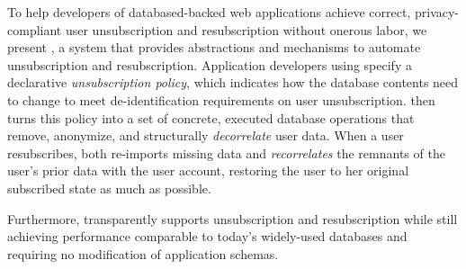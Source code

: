 To help developers of databased-backed web applications achieve correct,
privacy-compliant user unsubscription and resubscription without onerous labor, we present 
\sys, a system that provides abstractions and mechanisms to automate unsubscription and
resubscription.
%
Application developers using \sys specify a declarative \emph{unsubscription policy},
which indicates how the database contents need to change to meet de-identification
requirements on user unsubscription.
%
\sys then turns this policy into a set of concrete, executed database operations that remove,
anonymize, and structurally \emph{decorrelate} user data.
%
When a user resubscribes, \sys both re-imports missing data and
\emph{recorrelates} the remnants of the user's prior data with the user account,
restoring the user to her original subscribed state as much as possible.

Furthermore, \sys transparently supports unsubscription and resubscription while still achieving performance
comparable to today’s widely-used databases and requiring no modification of application schemas.

